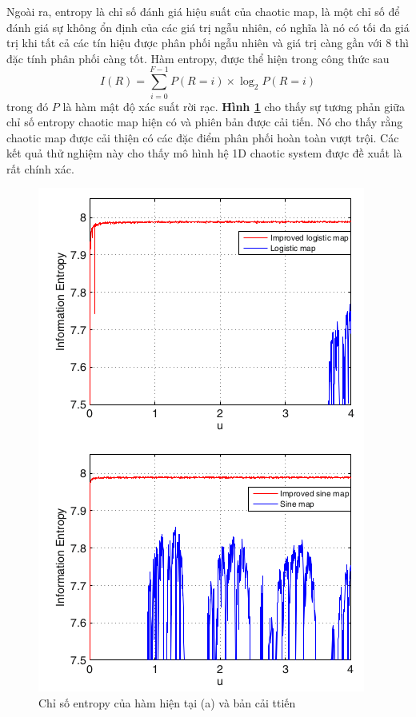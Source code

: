 Ngoài ra, entropy là chỉ số đánh giá hiệu suất của chaotic map, là một chỉ số để đánh giá sự không ổn định của các giá trị ngẫu nhiên, có nghĩa là nó có tối đa giá trị khi tất cả các tín hiệu được phân phối ngẫu nhiên và giá trị càng gần với 8 thì đặc tính phân phối càng tốt.
Hàm entropy, được thể hiện trong công thức sau
\begin{equation}
\label{eq:entropy}
I(R) = \sum_{i=0}^{F - 1 } P(R=i) \times \log_2P(R = i)
\end{equation}
trong đó $P$ là hàm mật độ xác suất rời rạc. \textbf{Hình \ref{fig:chap1-entropy}} cho thấy sự tương phản giữa chỉ số entropy chaotic map hiện có và phiên bản được cải tiến. Nó cho thấy rằng chaotic map được cải thiện có các đặc điểm phân phối hoàn toàn vượt trội. Các kết quả thử nghiệm này cho thấy mô hình hệ 1D chaotic system được đề xuất là rất chính xác.

\begin{figure}
    \centering
    \includegraphics[scale=0.5]{graphics/chapter-1/chap1-entropy.png}
    \caption{Chỉ số entropy của hàm hiện tại (a) và bản cải ttiến}
    \label{fig:chap1-entropy}
\end{figure}

